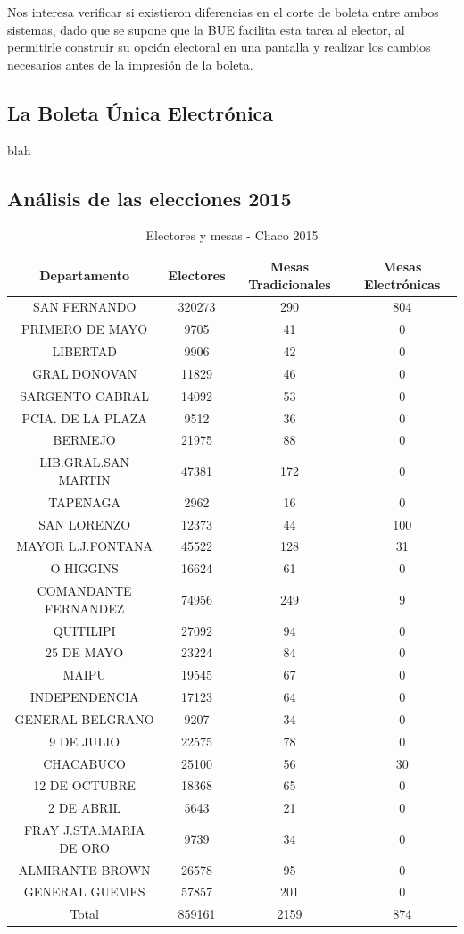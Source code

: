 \documentclass[12pt,a4paper]{article}
\begin{document}
Nos interesa verificar si existieron diferencias en el corte de boleta entre
ambos sistemas, dado que se supone que la BUE facilita esta tarea al elector, al
permitirle construir su opción electoral en una pantalla y realizar los cambios
necesarios antes de la impresión de la boleta.

\subsection{La Boleta Única Electrónica}
blah 

\subsection{Análisis de las elecciones 2015}

\renewcommand{\arraystretch}{1.25}
\begin{table}[h!]
\centering
\begin{tabular}{c c c c} 
 Departamento & Electores & Mesas Tradicionales & Mesas Electrónicas \\ [0.5ex] 
 \hline
SAN FERNANDO & 320273 & 290 & 804 \\
PRIMERO DE MAYO &	9705 & 41 & 0 \\
LIBERTAD & 9906 & 42 & 0 \\
GRAL.DONOVAN & 11829 & 46 & 0 \\
SARGENTO CABRAL &	14092 & 53 & 0 \\
PCIA. DE LA PLAZA &	9512 & 36 & 0 \\
BERMEJO	& 21975 & 88 & 0 \\
LIB.GRAL.SAN MARTIN	& 47381 & 172 & 0 \\
TAPENAGA & 2962 & 16 & 0 \\
SAN LORENZO &	12373 & 44 & 100 \\
MAYOR L.J.FONTANA &	45522 & 128 & 31 \\
O HIGGINS	& 16624 & 61 & 0 \\
COMANDANTE FERNANDEZ & 74956 & 249 & 9 \\
QUITILIPI	& 27092 & 94 & 0 \\
25 DE MAYO & 23224 & 84 & 0 \\
MAIPU & 19545 & 67 & 0 \\
INDEPENDENCIA	& 17123 & 64 & 0 \\
GENERAL BELGRANO & 9207 & 34 & 0 \\
9 DE JULIO & 22575 & 78 & 0 \\
CHACABUCO	& 25100 & 56 & 30 \\
12 DE OCTUBRE &	18368 & 65 & 0 \\
2 DE ABRIL & 5643 & 21 & 0 \\
FRAY J.STA.MARIA DE ORO	& 9739 & 34 & 0 \\
ALMIRANTE BROWN	& 26578 & 95 & 0 \\
GENERAL GUEMES & 57857 & 201 & 0 \\ 
 \hline
Total & 859161 & 2159 & 874 \\ [1ex]
 \hline
\end{tabular}
\caption{Electores y mesas - Chaco 2015}
\label{table:1}
\end{table}
\end{document}
